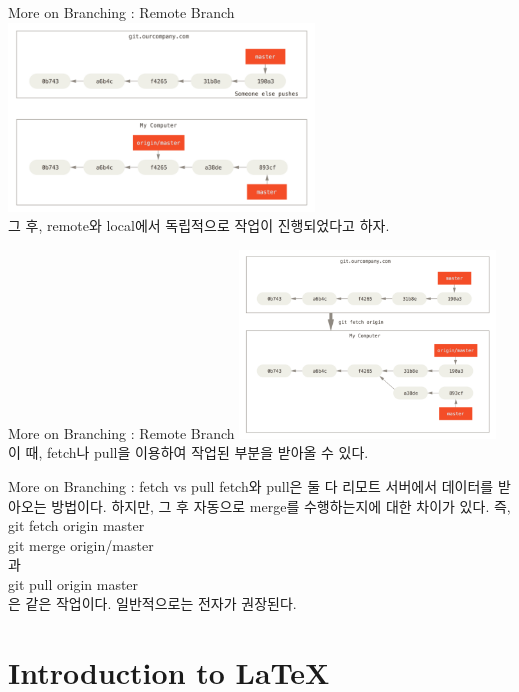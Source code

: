 \documentclass{beamer}
\begin{document}
\begin{frame}{More on Branching : Remote Branch}
\includegraphics[height=5cm,keepaspectratio]{remote-branches-2} \\
그 후, remote와 local에서 독립적으로 작업이 진행되었다고 하자.
\end{frame}


\begin{frame}{More on Branching : Remote Branch}
\includegraphics[height=5cm,keepaspectratio]{remote-branches-3} \\ 
이 때, fetch나 pull을 이용하여 작업된 부분을 받아올 수 있다.
\end{frame}

 
\begin{frame}{More on Branching : fetch vs pull}
fetch와 pull은 둘 다 리모트 서버에서 데이터를 받아오는 방법이다. 하지만, 그 후 자동으로 merge를 수행하는지에 대한 차이가 있다. 즉, \\
git fetch origin master \\
git merge origin/master \\
과 \\
git pull origin master \\
은 같은 작업이다. 일반적으로는 전자가 권장된다. 
\end{frame}


\section{Introduction to LaTeX} 
\end{document}
